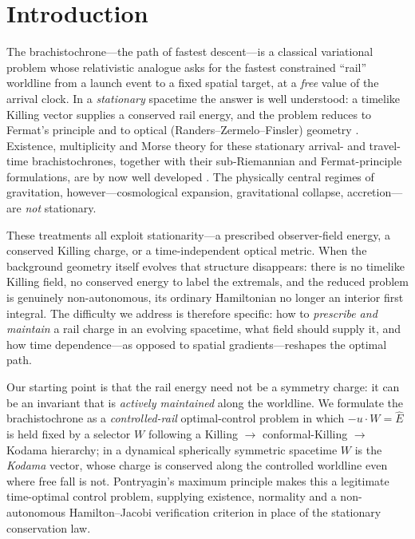\documentclass[12pt]{iopart}
\newcommand{\Ehat}{\hat E}
\theoremstyle{plain}
\theoremstyle{definition}
\theoremstyle{plain}
\theoremstyle{remark}
\begin{document}
\section{Introduction}
\label{sec:intro}
The brachistochrone---the path of fastest descent---is a classical variational problem
whose relativistic analogue asks for the fastest constrained ``rail'' worldline from a
launch event to a fixed spatial target, at a \emph{free} value of the arrival clock. In a
\emph{stationary} spacetime the answer is well understood: a timelike Killing vector
supplies a conserved rail energy, and the problem reduces to Fermat's principle and to
optical (Randers--Zermelo--Finsler) geometry
\cite{Perlick1991,PerlickRayOptics,Kovner1990,Randers1941,GibbonsWerner2008,GibbonsRanders2009,BaoRoblesShen}.
Existence, multiplicity and Morse theory for these stationary arrival- and travel-time
brachistochrones, together with their sub-Riemannian and Fermat-principle formulations,
are by now well developed
\cite{GiannoniPiccioneVerderesi1997,GiannoniPiccioneTausk2002,GiannoniPiccione2002,CaponioJavaloyes2026}.
The physically central regimes of gravitation, however---cosmological expansion,
gravitational collapse, accretion---are \emph{not} stationary.

These treatments all exploit stationarity---a prescribed observer-field energy, a
conserved Killing charge, or a time-independent optical metric. When the background
geometry itself evolves that structure disappears: there is no timelike Killing field, no
conserved energy to label the extremals, and the reduced problem is genuinely
non-autonomous, its ordinary Hamiltonian no longer an interior first integral. The
difficulty we address is therefore specific: how to \emph{prescribe and maintain} a rail
charge in an evolving spacetime, what field should supply it, and how time
dependence---as opposed to spatial gradients---reshapes the optimal path.

Our starting point is that the rail energy need not be a symmetry charge: it can be an
invariant that is \emph{actively maintained} along the worldline. We formulate the
brachistochrone as a \emph{controlled-rail} optimal-control problem in which
$-u\cdot W=\Ehat$ is held fixed by a selector $W$ following a Killing $\to$
conformal-Killing $\to$ Kodama hierarchy; in a dynamical spherically symmetric spacetime
$W$ is the \emph{Kodama} vector, whose charge is conserved along the controlled worldline
even where free fall is not. Pontryagin's maximum principle makes this a legitimate
time-optimal control problem, supplying existence, normality and a non-autonomous
Hamilton--Jacobi verification criterion in place of the stationary conservation law.
\end{document}
